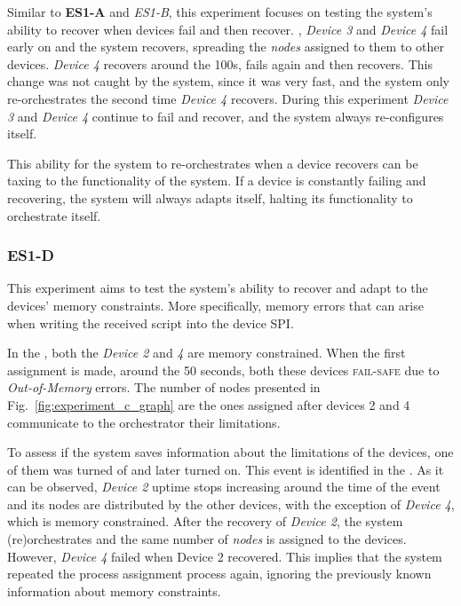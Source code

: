 Similar to \textbf{ES1-A} and \textit{ES1-B}, this experiment focuses on testing the system's ability to recover when devices fail and then recover. , \textit{Device 3} and \textit{Device 4} fail early on and the system recovers, spreading the \textit{nodes} assigned to them to other devices. \textit{Device 4} recovers around the 100s, fails again and then recovers. This change was not caught by the system, since it was very fast, and the system only re-orchestrates the second time \textit{Device 4} recovers. During this experiment \textit{Device 3} and \textit{Device 4} continue to fail and recover, and the system always re-configures itself.

This ability for the system to re-orchestrates when a device recovers can be taxing to the functionality of the system. If a device is constantly failing and recovering, the system will always adapts itself, halting its functionality to orchestrate itself.


\subsubsection{ES1-D}

This experiment aims to test the system's ability to recover and adapt to the devices' memory constraints. More specifically, memory errors that can arise when writing the received script into the device SPI.

In the , both the \textit{Device 2} and \textit{4} are memory constrained. When the first assignment is made, around the 50 seconds, both these devices \textsc{fail-safe} due to \textit{Out-of-Memory} errors. The number of nodes presented in Fig.~\ref{fig:experiment_c_graph} are the ones assigned after devices 2 and 4 communicate to the orchestrator their limitations. 

To assess if the system saves information about the limitations of the devices, one of them was turned of and later turned on. This event is identified in the . As it can be observed, \textit{Device 2} uptime stops increasing around the time of the event and its nodes are distributed by the other devices, with the exception of \textit{Device 4}, which is memory constrained. 
After the recovery of \textit{Device 2}, the system (re)orchestrates and the same number of \textit{nodes} is assigned to the devices. However, \textit{Device 4} failed when Device 2 recovered. This implies that the system repeated the process assignment process again, ignoring the previously known information about memory constraints.

